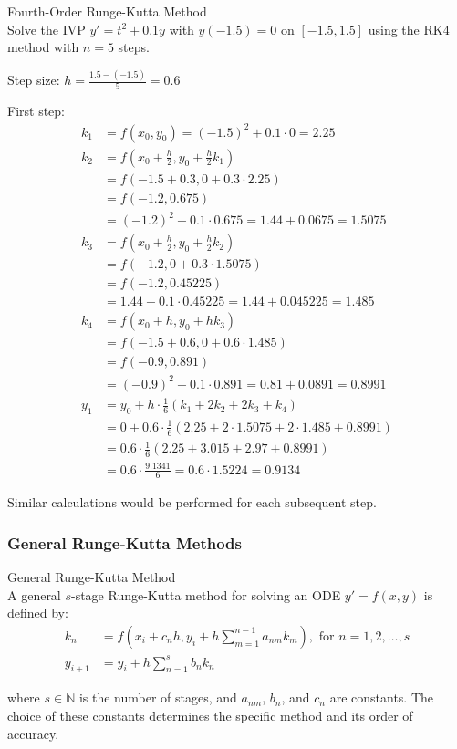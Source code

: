 \begin{example2}{Fourth-Order Runge-Kutta Method}\\
Solve the IVP $y' = t^2 + 0.1y$ with $y(-1.5) = 0$ on $[-1.5, 1.5]$ using the RK4 method with $n = 5$ steps.

Step size: $h = \frac{1.5-(-1.5)}{5} = 0.6$

First step:
\begin{align*}
k_1 &= f(x_0, y_0) = (-1.5)^2 + 0.1 \cdot 0 = 2.25\\
k_2 &= f\left(x_0 + \frac{h}{2}, y_0 + \frac{h}{2}k_1\right)\\
&= f(-1.5 + 0.3, 0 + 0.3 \cdot 2.25)\\
&= f(-1.2, 0.675)\\
&= (-1.2)^2 + 0.1 \cdot 0.675 = 1.44 + 0.0675 = 1.5075\\
k_3 &= f\left(x_0 + \frac{h}{2}, y_0 + \frac{h}{2}k_2\right)\\
&= f(-1.2, 0 + 0.3 \cdot 1.5075)\\
&= f(-1.2, 0.45225)\\
&= 1.44 + 0.1 \cdot 0.45225 = 1.44 + 0.045225 = 1.485\\
k_4 &= f(x_0 + h, y_0 + hk_3)\\
&= f(-1.5 + 0.6, 0 + 0.6 \cdot 1.485)\\
&= f(-0.9, 0.891)\\
&= (-0.9)^2 + 0.1 \cdot 0.891 = 0.81 + 0.0891 = 0.8991\\
y_1 &= y_0 + h \cdot \frac{1}{6}(k_1 + 2k_2 + 2k_3 + k_4)\\
&= 0 + 0.6 \cdot \frac{1}{6}(2.25 + 2 \cdot 1.5075 + 2 \cdot 1.485 + 0.8991)\\
&= 0.6 \cdot \frac{1}{6}(2.25 + 3.015 + 2.97 + 0.8991)\\
&= 0.6 \cdot \frac{9.1341}{6} = 0.6 \cdot 1.5224 = 0.9134
\end{align*}

Similar calculations would be performed for each subsequent step.
\end{example2}

\subsubsection{General Runge-Kutta Methods}

\begin{definition}{General Runge-Kutta Method}\\
A general $s$-stage Runge-Kutta method for solving an ODE $y'=f(x,y)$ is defined by:
\begin{align*}
k_n &= f\left(x_i + c_n h, y_i + h \sum_{m=1}^{n-1} a_{nm} k_m \right), \text{ for } n = 1, 2, \ldots, s\\
y_{i+1} &= y_i + h \sum_{n=1}^{s} b_n k_n
\end{align*}

where $s \in \mathbb{N}$ is the number of stages, and $a_{nm}$, $b_n$, and $c_n$ are constants. The choice of these constants determines the specific method and its order of accuracy.
\end{definition}

